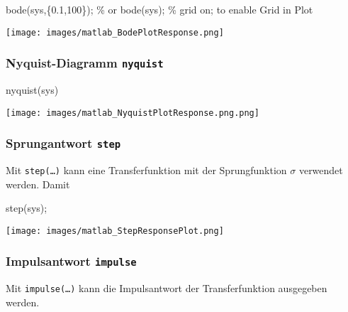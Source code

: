 \documentclass[
  10pt,
  a4paper,
  twocolumn]{article}
\newenvironment{Shaded}{}{}
\newcommand{\CommentTok}[1]{\textcolor[rgb]{0.42,0.45,0.49}{#1}}
\newcommand{\FloatTok}[1]{\textcolor[rgb]{0.00,0.36,0.77}{#1}}
\newcommand{\NormalTok}[1]{\textcolor[rgb]{0.14,0.16,0.18}{#1}}
\newcommand{\OperatorTok}[1]{\textcolor[rgb]{0.14,0.16,0.18}{#1}}
\newcommand{\VariableTok}[1]{\textcolor[rgb]{0.89,0.38,0.04}{#1}}
\numberwithin{equation}{section}
\begin{document}
\begin{Shaded}
\begin{Highlighting}[]
\VariableTok{bode}\NormalTok{(}\VariableTok{sys}\OperatorTok{,}\NormalTok{\{}\FloatTok{0.1}\OperatorTok{,}\FloatTok{100}\NormalTok{\})}\OperatorTok{;} \CommentTok{\% or bode(sys);}
\CommentTok{\% grid on; to enable Grid in Plot}
\end{Highlighting}
\end{Shaded}

\texttt{[image: images/matlab\_BodePlotResponse.png]}

\subsubsection{\texorpdfstring{Nyquist-Diagramm
\texttt{nyquist}}{Nyquist-Diagramm nyquist}}\label{nyquist-diagramm-nyquist}

\begin{Shaded}
\begin{Highlighting}[]
\VariableTok{nyquist}\NormalTok{(}\VariableTok{sys}\NormalTok{)}
\end{Highlighting}
\end{Shaded}

\texttt{[image: images/matlab\_NyquistPlotResponse.png.png]}

\subsubsection{\texorpdfstring{Sprungantwort
\texttt{step}}{Sprungantwort step}}\label{sprungantwort-step}

Mit \texttt{step(…)} kann eine Transferfunktion mit der Sprungfunktion
\(\sigma\) verwendet werden. Damit

\begin{Shaded}
\begin{Highlighting}[]
\VariableTok{step}\NormalTok{(}\VariableTok{sys}\NormalTok{)}\OperatorTok{;}
\end{Highlighting}
\end{Shaded}

\texttt{[image: images/matlab\_StepResponsePlot.png]}

\subsubsection{\texorpdfstring{Impulsantwort
\texttt{impulse}}{Impulsantwort impulse}}\label{impulsantwort-impulse}

Mit \texttt{impulse(…)} kann die Impulsantwort der Transferfunktion
ausgegeben werden.
\end{document}
